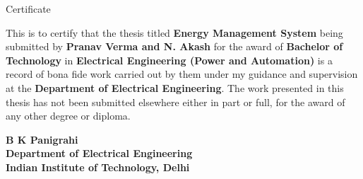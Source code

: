 \begin{center}
\LARGE{ Certificate} 
\end{center}

\vspace{0.5in}

This is to certify that the thesis titled {\bfseries Energy Management System} being submitted by
{\bfseries Pranav Verma and N. Akash} for the award of {\bfseries Bachelor of Technology} in {\bfseries Electrical Engineering (Power and Automation)} is a record of bona fide work carried out by them under my guidance and supervision at the {\bfseries Department of Electrical Engineering}. The work presented in this thesis has not been submitted elsewhere either in part or full, for the award of any other degree or diploma.

\vspace{1.5in}


{\bfseries B K Panigrahi} \\
{\bfseries Department of Electrical Engineering} \\
{\bfseries Indian Institute of Technology, Delhi}\\ 
